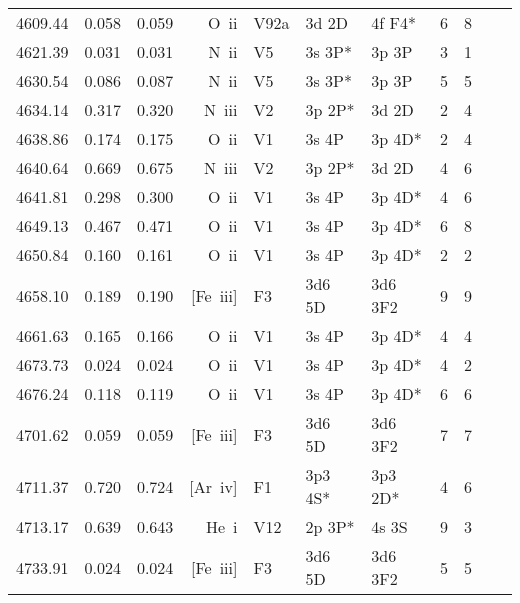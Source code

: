 \begin{longtable}{lrlrlllllll}
 4609.44 &   0.058 &   0.059 &  O~{\sc ii}      &  V92a      &  3d 2D     &  4f F4*    &          6 &        8    \\
 4621.39 &   0.031 &   0.031 &  N~{\sc ii}      &  V5        &  3s 3P*    &  3p 3P     &          3 &        1    \\
 4630.54 &   0.086 &   0.087 &  N~{\sc ii}      &  V5        &  3s 3P*    &  3p 3P     &          5 &        5    \\
 4634.14 &   0.317 &   0.320 &  N~{\sc iii}     &  V2        &  3p 2P*    &  3d 2D     &          2 &        4    \\
 4638.86 &   0.174 &   0.175 &  O~{\sc ii}      &  V1        &  3s 4P     &  3p 4D*    &          2 &        4    \\
 4640.64 &   0.669 &   0.675 &  N~{\sc iii}     &  V2        &  3p 2P*    &  3d 2D     &          4 &        6    \\
 4641.81 &   0.298 &   0.300 &  O~{\sc ii}      &  V1        &  3s 4P     &  3p 4D*    &          4 &        6    \\
 4649.13 &   0.467 &   0.471 &  O~{\sc ii}      &  V1        &  3s 4P     &  3p 4D*    &          6 &        8    \\
 4650.84 &   0.160 &   0.161 &  O~{\sc ii}      &  V1        &  3s 4P     &  3p 4D*    &          2 &        2    \\
 4658.10 &   0.189 &   0.190 &  [Fe~{\sc iii}]  &  F3        &  3d6 5D    &  3d6 3F2   &          9 &        9    \\
 4661.63 &   0.165 &   0.166 &  O~{\sc ii}      &  V1        &  3s 4P     &  3p 4D*    &          4 &        4    \\
 4673.73 &   0.024 &   0.024 &  O~{\sc ii}      &  V1        &  3s 4P     &  3p 4D*    &          4 &        2    \\
 4676.24 &   0.118 &   0.119 &  O~{\sc ii}      &  V1        &  3s 4P     &  3p 4D*    &          6 &        6    \\
 4701.62 &   0.059 &   0.059 &  [Fe~{\sc iii}]  &  F3        &  3d6 5D    &  3d6 3F2   &          7 &        7    \\
 4711.37 &   0.720 &   0.724 &  [Ar~{\sc iv}]   &  F1        &  3p3 4S*   &  3p3 2D*   &          4 &        6    \\
 4713.17 &   0.639 &   0.643 &  He~{\sc i}      &  V12       &  2p 3P*    &  4s 3S     &          9 &        3    \\
 4733.91 &   0.024 &   0.024 &  [Fe~{\sc iii}]  &  F3        &  3d6 5D    &  3d6 3F2   &          5 &        5    \\

\end{longtable}
